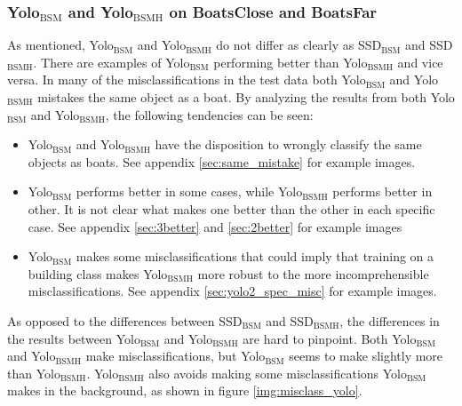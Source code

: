 \subsubsection{Yolo$_{\text{BSM}}$ and Yolo$_{\text{BSMH}}$ on BoatsClose and BoatsFar}

As mentioned, Yolo$_{\text{BSM}}$ and Yolo$_{\text{BSMH}}$ do not differ as clearly as SSD$_{\text{BSM}}$ and SSD$_{\text{BSMH}}$. There are examples of Yolo$_{\text{BSM}}$ performing better than Yolo$_{\text{BSMH}}$ and vice versa. In many of the misclassifications in the test data both Yolo$_{\text{BSM}}$ and Yolo$_{\text{BSMH}}$ mistakes the same object as a boat. By analyzing the results from both Yolo$_{\text{BSM}}$ and Yolo$_{\text{BSMH}}$, the following tendencies can be seen:

\begin{itemize}
    \item Yolo$_{\text{BSM}}$ and Yolo$_{\text{BSMH}}$ have the disposition to wrongly classify the same objects as boats. See appendix \ref{sec:same_mistake} for example images.
    \item Yolo$_{\text{BSM}}$ performs better in some cases, while Yolo$_{\text{BSMH}}$ performs better in other. It is not clear what makes one better than the other in each specific case. See appendix \ref{sec:3better} and \ref{sec:2better} for example images
    \item Yolo$_{\text{BSM}}$ makes some misclassifications that could imply that training on a building class makes Yolo$_{\text{BSMH}}$ more robust to the more incomprehensible misclassifications. See appendix \ref{sec:yolo2_spec_misc} for example images.
\end{itemize}

\noindent
As opposed to the differences between SSD$_{\text{BSM}}$ and SSD$_{\text{BSMH}}$, the differences in the results between Yolo$_{\text{BSM}}$ and Yolo$_{\text{BSMH}}$ are hard to pinpoint. Both Yolo$_{\text{BSM}}$ and Yolo$_{\text{BSMH}}$ make misclassifications, but Yolo$_{\text{BSM}}$ seems to make slightly more than Yolo$_{\text{BSMH}}$. Yolo$_{\text{BSMH}}$ also avoids making some misclassifications Yolo$_{\text{BSM}}$ makes in the background, as shown in figure \ref{img:misclass_yolo}.

